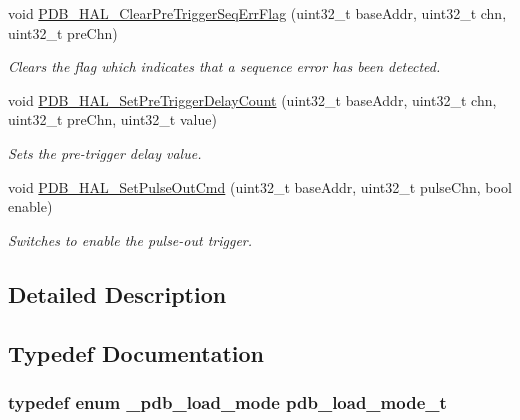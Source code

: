 \begin{DoxyCompactItemize}
void \hyperlink{group__pdb__hal_gaf2bb2448e5b1d963638db5526e8545ef}{P\+D\+B\+\_\+\+H\+A\+L\+\_\+\+Clear\+Pre\+Trigger\+Seq\+Err\+Flag} (uint32\+\_\+t base\+Addr, uint32\+\_\+t chn, uint32\+\_\+t pre\+Chn)
\begin{DoxyCompactList}\small\item\em Clears the flag which indicates that a sequence error has been detected. \end{DoxyCompactList}\item 
void \hyperlink{group__pdb__hal_ga83a1deb20007651ed2b52bdcae9702e9}{P\+D\+B\+\_\+\+H\+A\+L\+\_\+\+Set\+Pre\+Trigger\+Delay\+Count} (uint32\+\_\+t base\+Addr, uint32\+\_\+t chn, uint32\+\_\+t pre\+Chn, uint32\+\_\+t value)
\begin{DoxyCompactList}\small\item\em Sets the pre-\/trigger delay value. \end{DoxyCompactList}\item 
void \hyperlink{group__pdb__hal_ga8c6f17719ef1626da57a17dc79bc891e}{P\+D\+B\+\_\+\+H\+A\+L\+\_\+\+Set\+Pulse\+Out\+Cmd} (uint32\+\_\+t base\+Addr, uint32\+\_\+t pulse\+Chn, bool enable)
\begin{DoxyCompactList}\small\item\em Switches to enable the pulse-\/out trigger. \end{DoxyCompactList}\end{DoxyCompactItemize}


\subsection{Detailed Description}


\subsection{Typedef Documentation}
\subsubsection[{\texorpdfstring{pdb\+\_\+load\+\_\+mode\+\_\+t}{pdb_load_mode_t}}]{\setlength{\rightskip}{0pt plus 5cm}typedef enum {\bf \+\_\+pdb\+\_\+load\+\_\+mode}  {\bf pdb\+\_\+load\+\_\+mode\+\_\+t}}\hypertarget{group__pdb__hal_gaee15374478afc65a8d15ee4b5e1fdd44}{}\label{group__pdb__hal_gaee15374478afc65a8d15ee4b5e1fdd44}


